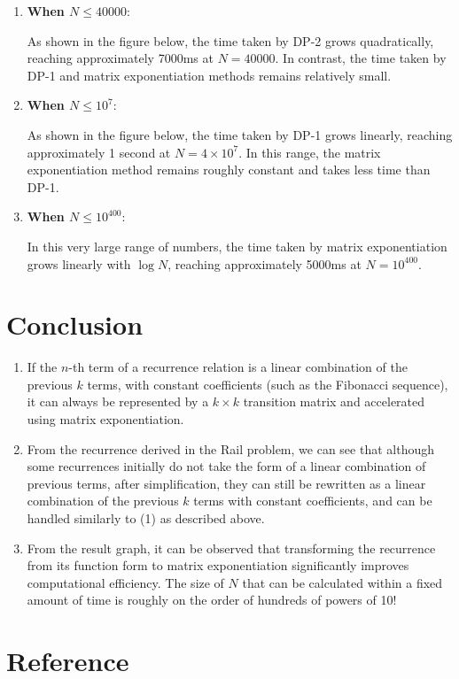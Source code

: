 \begin{enumerate}
    \item \textbf{When $N \leq 40000$}: 
    
    As shown in the figure below, the time taken by DP-2 grows quadratically, reaching approximately 7000ms at \(N=40000\). In contrast, the time taken by DP-1 and matrix exponentiation methods remains relatively small.
    \item \textbf{When $N \leq 10^7$}:
    
    As shown in the figure below, the time taken by DP-1 grows linearly, reaching approximately 1 second at \(N=4 \times 10^7\). In this range, the matrix exponentiation method remains roughly constant and takes less time than DP-1.

    \item \textbf{When $N \leq 10^{400}$}:
    
    In this very large range of numbers, the time taken by matrix exponentiation grows linearly with \( \log N \), reaching approximately 5000ms at \(N = 10^{400}\).
\end{enumerate}

\section{Conclusion}

\begin{enumerate}
    \item If the \(n\)-th term of a recurrence relation is a linear combination of the previous \(k\) terms, with constant coefficients (such as the Fibonacci sequence), it can always be represented by a \(k \times k\) transition matrix and accelerated using matrix exponentiation.
    \item From the recurrence derived in the Rail problem, we can see that although some recurrences initially do not take the form of a linear combination of previous terms, after simplification, they can still be rewritten as a linear combination of the previous \(k\) terms with constant coefficients, and can be handled similarly to (1) as described above.
    \item From the result graph, it can be observed that transforming the recurrence from its function form to matrix exponentiation significantly improves computational efficiency. The size of \(N\) that can be calculated within a fixed amount of time is roughly on the order of hundreds of powers of 10!
\end{enumerate}

\section{Reference}